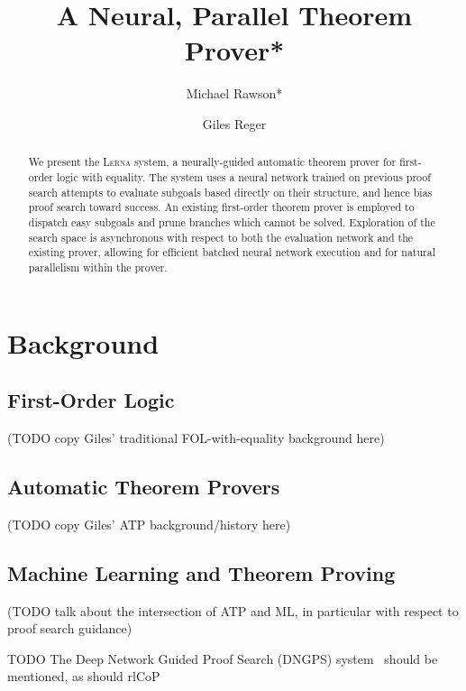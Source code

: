 \documentclass[runningheads]{llncs}
\newcommand{\lerna}{\textsc{Lerna}}
\begin{document}
\title{A Neural, Parallel Theorem Prover*}
\author{
	Michael Rawson* \and
	Giles Reger
}
\maketitle

\begin{abstract}
	We present the \lerna{} system, a neurally-guided automatic theorem prover for first-order logic with equality.
	The system uses a neural network trained on previous proof search attempts to evaluate subgoals based directly on their structure, and hence bias proof search toward success.
	An existing first-order theorem prover is employed to dispatch easy subgoals and prune branches which cannot be solved.
	Exploration of the search space is asynchronous with respect to both the evaluation network and the existing prover, allowing for efficient batched neural network execution and for natural parallelism within the prover.
\end{abstract}

\section{Background}

\subsection{First-Order Logic}
(TODO copy Giles' traditional FOL-with-equality background here)

\subsection{Automatic Theorem Provers}
(TODO copy Giles' ATP background/history here)

\subsection{Machine Learning and Theorem Proving}
(TODO talk about the intersection of ATP and ML, in particular with respect to proof search guidance)

TODO The Deep Network Guided Proof Search (DNGPS) system~\cite{DNGPS} should be mentioned, as should rlCoP~\cite{rlCoP}
\end{document}
